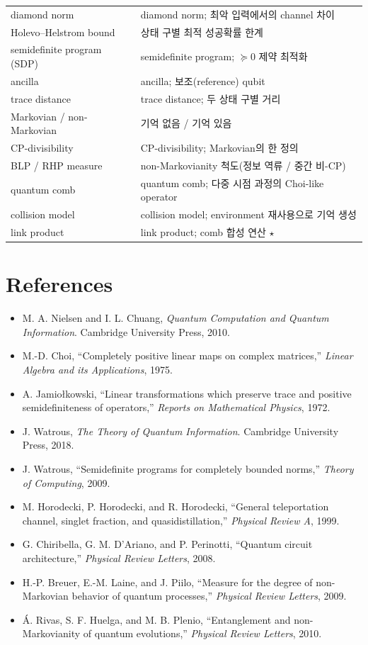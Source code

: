 \documentclass[11pt,a4paper]{article}
\theoremstyle{definition}
\theoremstyle{plain}
\theoremstyle{remark}
\begin{document}
\begin{longtable}{p{}p{}}
diamond norm & diamond norm; 최악 입력에서의 channel 차이 \\
Holevo--Helstrom bound & 상태 구별 최적 성공확률 한계 \\
semidefinite program (SDP) & semidefinite program; $\succeq0$ 제약 최적화 \\
ancilla & ancilla; 보조(reference) qubit \\
trace distance & trace distance; 두 상태 구별 거리 \\
Markovian / non-Markovian & 기억 없음 / 기억 있음 \\
CP-divisibility & CP-divisibility; Markovian의 한 정의 \\
BLP / RHP measure & non-Markovianity 척도(정보 역류 / 중간 비-CP) \\
quantum comb & quantum comb; 다중 시점 과정의 Choi-like operator \\
collision model & collision model; environment 재사용으로 기억 생성 \\
link product & link product; comb 합성 연산 $\star$ \\
\bottomrule
\end{longtable}

\section*{References}
\begin{itemize}
  \item[(1)] M. A. Nielsen and I. L. Chuang, \textit{Quantum Computation and Quantum Information}. Cambridge University Press, 2010.
  \item[(2)] M.-D. Choi, ``Completely positive linear maps on complex matrices,'' \textit{Linear Algebra and its Applications}, 1975.
  \item[(3)] A. Jamio{\l}kowski, ``Linear transformations which preserve trace and positive semidefiniteness of operators,'' \textit{Reports on Mathematical Physics}, 1972.
  \item[(4)] J. Watrous, \textit{The Theory of Quantum Information}. Cambridge University Press, 2018.
  \item[(5)] J. Watrous, ``Semidefinite programs for completely bounded norms,'' \textit{Theory of Computing}, 2009.
  \item[(6)] M. Horodecki, P. Horodecki, and R. Horodecki, ``General teleportation channel, singlet fraction, and quasidistillation,'' \textit{Physical Review A}, 1999.
  \item[(7)] G. Chiribella, G. M. D'Ariano, and P. Perinotti, ``Quantum circuit architecture,'' \textit{Physical Review Letters}, 2008.
  \item[(8)] H.-P. Breuer, E.-M. Laine, and J. Piilo, ``Measure for the degree of non-Markovian behavior of quantum processes,'' \textit{Physical Review Letters}, 2009.
  \item[(9)] Á. Rivas, S. F. Huelga, and M. B. Plenio, ``Entanglement and non-Markovianity of quantum evolutions,'' \textit{Physical Review Letters}, 2010.
\end{itemize}
\end{document}
